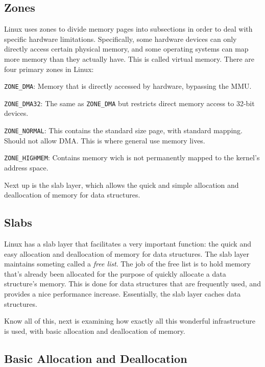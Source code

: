 \documentclass[10pt,letterpaper,onecolumn,draftclsnofoot]{IEEEtran}
\begin{document}
  \subsection{Zones}
	Linux uses zones to divide memory pages into subsections in order to
	deal with specific hardware limitations. Specifically, some hardware
	devices can only directly access certain physical memory, and some 
	operating systems can map more memory than they actually have. This is
	called virtual memory. There are four primary zones in Linux:
	\begin{description}
		\item \texttt{ZONE\_DMA}: Memory that is directly accessed by
			hardware, bypassing the MMU. 
		\item \texttt{ZONE\_DMA32}: The same as \texttt{ZONE\_DMA} but
			restricts direct memory access to 32-bit devices. 
		\item \texttt{ZONE\_NORMAL}: This contains the standard size
			page, with standard mapping. Should not allow DMA. This
			is where general use memory lives.
		\item \texttt{ZONE\_HIGHMEM}: Contains memory wich is not 
			permanently mapped to the kernel's address space.
	\end{description}
	\cite{robertlove2010}
	Next up is the slab layer, which allows the quick and simple allocation
	and deallocation of memory for data structures. 
  \subsection{Slabs}
	Linux has a slab layer that facilitates a very important function: the
	quick and easy allocation and deallocation of memory for data
	structures. The slab layer maintains someting called a \textit{free list}.
	The job of the free list is to hold memory that's already been allocated
	for the purpose of quickly allocate a data structure's memory. This is
	done for data structures that are frequently used, and provides a nice
	performance increase. Essentially, the slab layer caches data structures.
	\cite{robertlove2010}
	
	Know all of this, next is examining how exactly all this wonderful
	infrastructure is used, with basic allocation and deallocation of memory.

   \subsection{Basic Allocation and Deallocation}
\end{document}
